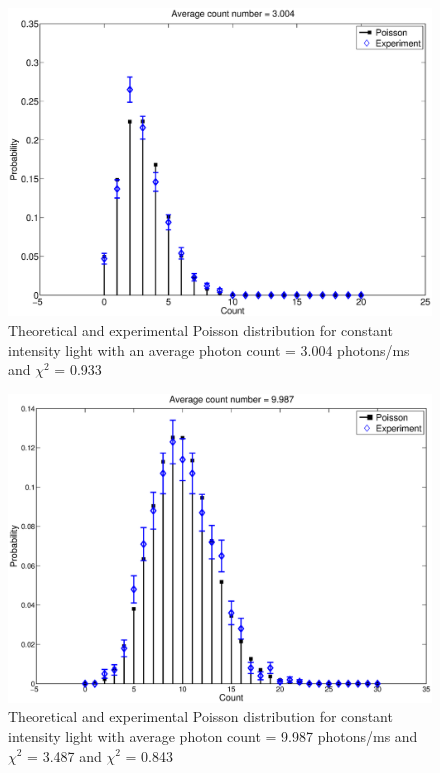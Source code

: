 \begin{figure}[H]
  \includegraphics[totalheight=0.6\textwidth]{figs/ci3000}
  \caption{Theoretical and experimental Poisson distribution for constant intensity light with an average photon count = 3.004 photons/ms and $\chi^{2}$ = 0.933}
  \label{ci3000}
\end{figure}

\begin{figure}[H]
  \includegraphics[totalheight=0.6\textwidth]{figs/ci10000}
  \caption{Theoretical and experimental Poisson distribution for constant intensity light with average photon count = 9.987 photons/ms and $\chi^{2}$ = 3.487 and $\chi^{2}$ = 0.843}
  \label{ci10000}
\end{figure}

